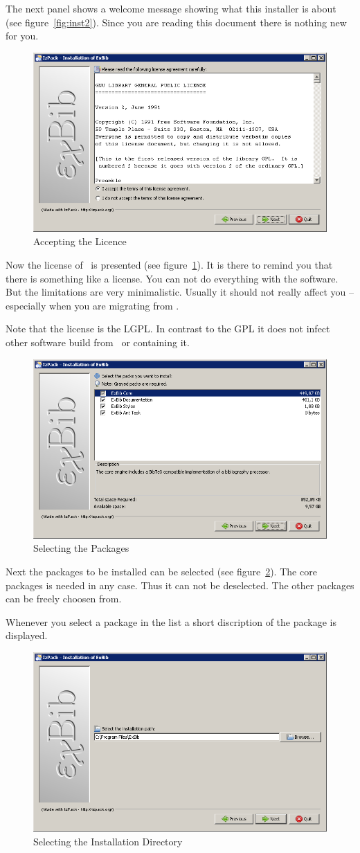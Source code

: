 The next panel shows a welcome message showing what this installer is
about (see figure~\ref{fig:inst2}). Since you are reading this
document there is nothing new for you.

\begin{figure}[!ht]
  \centering
  \includegraphics[width=.45\textwidth]{img/inst4}
  \caption{Accepting the Licence}
  \label{fig:inst3}
\end{figure}

Now the license of \ExBib\ is presented (see figure~\ref{fig:inst3}).
It is there to remind you that there is something like a license. You
can not do everything with the software. But the limitations are very
minimalistic. Usually it should not really affect you -- especially
when you are migrating from \BibTeX.

Note that the license is the LGPL. In contrast to the GPL it does not
infect other software build from \ExBib\ or containing it.

\begin{figure}[!ht]
  \centering
  \includegraphics[width=.45\textwidth]{img/inst5}
  \caption{Selecting the Packages}
  \label{fig:inst4}
\end{figure}

Next the packages to be installed can be selected (see
figure~\ref{fig:inst4}). The core packages is needed in any case. Thus
it can not be deselected. The other packages can be freely choosen
from.

Whenever you select a package in the list a short discription of the
package is displayed.

\begin{figure}[!ht]
  \centering
  \includegraphics[width=.45\textwidth]{img/inst6}
  \caption{Selecting the Installation Directory}
  \label{fig:inst5}
\end{figure}

